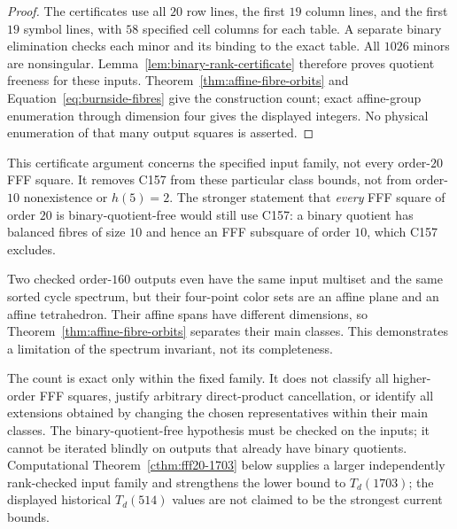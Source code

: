 \begin{proof}
The certificates use all $20$ row lines, the first $19$ column lines,
and the first $19$ symbol lines, with $58$ specified cell columns for
each table. A separate binary elimination checks each minor and its
binding to the exact table. All $1026$ minors are nonsingular.
Lemma~\ref{lem:binary-rank-certificate} therefore proves quotient
freeness for these inputs. Theorem~\ref{thm:affine-fibre-orbits} and
Equation~\eqref{eq:burnside-fibres} give the construction count;
exact affine-group enumeration through dimension four gives the displayed
integers. No physical enumeration of that many output squares is asserted.
\end{proof}

This certificate argument concerns the specified input family, not every
order-$20$ FFF square. It removes C157 from these particular class bounds,
not from order-$10$ nonexistence or $h(5)=2$. The stronger statement that
\emph{every} FFF square of order $20$ is binary-quotient-free would still
use C157: a binary quotient has balanced fibres of size $10$ and hence
an FFF subsquare of order $10$, which C157 excludes.

Two checked order-$160$ outputs even have the same input multiset
and the same sorted cycle spectrum, but their four-point color sets
are an affine plane and an affine tetrahedron. Their affine spans
have different dimensions, so Theorem~\ref{thm:affine-fibre-orbits}
separates their main classes. This demonstrates a limitation of
the spectrum invariant, not its completeness.

The count is exact only within the fixed family. It does not
classify all higher-order FFF squares, justify arbitrary
direct-product cancellation, or identify all extensions obtained
by changing the chosen representatives within their main classes.
The binary-quotient-free hypothesis must be checked on the inputs;
it cannot be iterated blindly on outputs that already have binary quotients.
Computational Theorem~\ref{cthm:fff20-1703} below supplies a larger
independently rank-checked input family and strengthens the lower bound
to $T_d(1703)$; the displayed historical $T_d(514)$ values are not
claimed to be the strongest current bounds.

